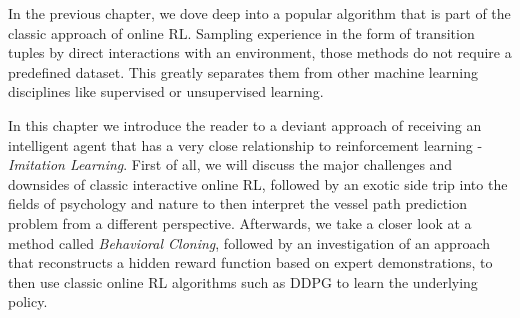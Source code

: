 In the previous chapter, we dove deep into a popular algorithm that is part of the classic approach of online RL. Sampling experience in the form of transition tuples by direct interactions with an environment, those methods do not require a predefined dataset. This greatly separates them from other machine learning disciplines like supervised or unsupervised learning.
\par 
In this chapter we introduce the reader to a deviant approach of receiving an intelligent agent that has a very close relationship to reinforcement learning - \textit{Imitation Learning}. First of all, we will discuss the major challenges and downsides of classic interactive online RL, followed by an exotic side trip into the fields of psychology and nature to then interpret the vessel path prediction problem from a different perspective. Afterwards, we take a closer look at a method called \textit{Behavioral Cloning}, followed by an investigation of an approach that reconstructs a hidden reward function based on expert demonstrations, to then use classic online RL algorithms such as DDPG to learn the underlying policy. 